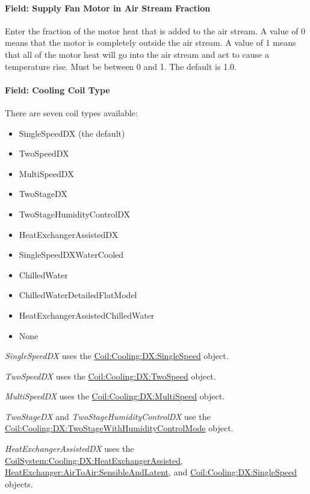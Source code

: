 \paragraph{Field: Supply Fan Motor in Air Stream Fraction}\label{field-supply-fan-motor-in-air-stream-fraction-3}

Enter the fraction of the motor heat that is added to the air stream. A value of 0 means that the motor is completely outside the air stream. A value of 1 means that all of the motor heat will go into the air stream and act to cause a temperature rise. Must be between 0 and 1. The default is 1.0.

\paragraph{Field: Cooling Coil Type}\label{field-cooling-coil-type-7}

There are seven coil types available:

\begin{itemize}
\item
  SingleSpeedDX (the default)
\item
  TwoSpeedDX
\item
  MultiSpeedDX
\item
  TwoStageDX
\item
  TwoStageHumidityControlDX
\item
  HeatExchangerAssistedDX
\item
  SingleSpeedDXWaterCooled
\item
  ChilledWater
\item
  ChilledWaterDetailedFlatModel
\item
  HeatExchangerAssistedChilledWater
\item
  None
\end{itemize}

\emph{SingleSpeedDX} uses the \hyperref[coilcoolingdxsinglespeed]{Coil:Cooling:DX:SingleSpeed} object.

\emph{TwoSpeedDX} uses the \hyperref[coilcoolingdxtwospeed]{Coil:Cooling:DX:TwoSpeed} object.

\emph{MultiSpeedDX} uses the \hyperref[coilcoolingdxmultispeed]{Coil:Cooling:DX:MultiSpeed} object.

\emph{TwoStageDX} and \emph{TwoStageHumidityControlDX} use the \hyperref[coilcoolingdxtwostagewithhumiditycontrolmode]{Coil:Cooling:DX:TwoStageWithHumidityControlMode} object.

\emph{HeatExchangerAssistedDX} uses the \hyperref[coilsystemcoolingdxheatexchangerassisted]{CoilSystem:Cooling:DX:HeatExchangerAssisted}, \hyperref[heatexchangerairtoairsensibleandlatent]{HeatExchanger:AirToAir:SensibleAndLatent}, and \hyperref[coilcoolingdxsinglespeed]{Coil:Cooling:DX:SingleSpeed} objects.

